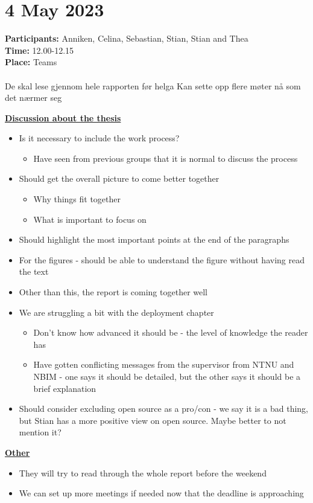 \section{4 May 2023}
\textbf{Participants:} Anniken, Celina, Sebastian, Stian, Stian and Thea \\
\textbf{Time:} 12.00-12.15 \\
\textbf{Place:} Teams
\\~\\
De skal lese gjennom hele rapporten før helga
Kan sette opp flere møter nå som det nærmer seg

\textbf{\underline{Discussion about the thesis}}
\begin{itemize}
    \item Is it necessary to include the work process? 
        \begin{itemize}
            \item Have seen from previous groups that it is normal to discuss the process
        \end{itemize}
    \item Should get the overall picture to come better together
        \begin{itemize}
            \item Why things fit together
            \item What is important to focus on 
        \end{itemize}
    \item Should highlight the most important points at the end of the paragraphs
    \item For the figures - should be able to understand the figure without having read the text
    \item Other than this, the report is coming together well
    \item We are struggling a bit with the deployment chapter
        \begin{itemize}
            \item Don't know how advanced it should be - the level of knowledge the reader has
            \item Have gotten conflicting messages from the supervisor from NTNU and NBIM - one says it should be detailed, but the other says it should be a brief explanation
        \end{itemize}
    \item Should consider excluding open source as a pro/con - we say it is a bad thing, but Stian has a more positive view on open source. Maybe better to not mention it?
\end{itemize}

\textbf{\underline{Other}}
\begin{itemize}
    \item They will try to read through the whole report before the weekend
    \item We can set up more meetings if needed now that the deadline is approaching
\end{itemize}